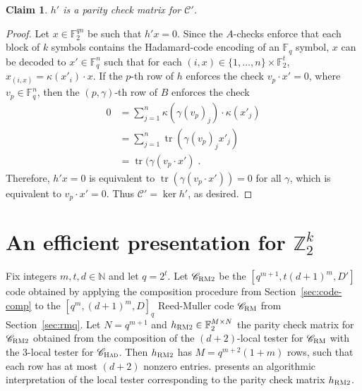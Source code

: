 \documentclass[11pt]{article}
\newtheorem{claim}[theorem]{Claim}
\theoremstyle{definition}
\newcommand{\code}{\mathscr{C}}
\newcommand{\N}{\ensuremath{\mathbb{N}}}
\newcommand{\F}{\ensuremath{\mathbb{F}}}
\newcommand{\Z}{\ensuremath{\mathbb{Z}}}
\newcommand{\RM}{\ensuremath{\textsc{RM}}}
\newcommand{\bRM}{\ensuremath{\textsc{RM2}}}
\newcommand{\had}{\textsc{Had}}
\DeclareMathOperator{\tr}{tr}
\begin{document}
\begin{claim}
$h'$ is a parity check matrix for $\code'$.
\end{claim}


\begin{proof}
Let $x\in \F_2^{qn}$ be such that $h'x=0$. Since the $A$-checks enforce that each block of $k$ symbols contains the Hadamard-code encoding of an $\F_q$ symbol, $x$ can be decoded to $x'\in \F_q^n$ such that for each $(i,x)\in \{1,\ldots,n\}\times \F_2^t$, $x_{(i,x)} = \kappa(x'_i)\cdot x$. If the $p$-th row of $h$ enforces the check $v_p\cdot x'=0$, where $v_p\in \F_q^n$, then 
the $(p,\gamma)$-th row of $B$ enforces the check 
\begin{align*}
0&=\sum_{j=1}^n \kappa(\gamma (v_p)_j) \cdot \kappa(x'_j)\\
&= \sum_{j=1}^n \tr( \gamma (v_p)_j x'_j) \\
&= \tr(\gamma (v_p\cdot  x')\;.
\end{align*}
Therefore, $h'x=0$ is equivalent to $\tr(\gamma(v_p \cdot x'))=0$ for all $\gamma$, which is equivalent to $v_p\cdot x'=0$. Thus $\code'=\ker h'$, as desired. 
\end{proof}

\section{An efficient presentation for $\Z_2^k$}
\label{sec:eff-z2k}

Fix integers $m,t,d \in \N$ and let $q=2^t$. Let $\code_{\bRM}$ be the $[q^{m+1},t(d+1)^m,D']$ code obtained by applying the composition procedure from Section~\ref{sec:code-comp} to the $[q^m,(d+1)^m,D]_q$ Reed-Muller code $\code_\RM$ from Section~\ref{sec:rmq}. Let $N=q^{m+1}$ and $h_{\bRM}\in \F_2^{M\times N}$ the parity check matrix for $\code_{\bRM}$ obtained from the composition of the $(d+2)$-local tester for $\code_\RM$ with the $3$-local tester for $\code_\had$. Then $h_\bRM$ has $M=  q^{m+2}(1+m)$ rows, such that each row has at most $(d+2)$ nonzero entries. 
 presents an algorithmic interpretation of the local tester corresponding to the parity check matrix $h_{\bRM}$. 

\end{document}

